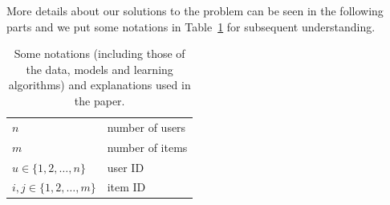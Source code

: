\documentclass[sigconf]{acmart}
\begin{document}
More details about our solutions to the problem can be seen in the following parts and we put some notations in Table~\ref{tbl:notation} for subsequent understanding.
\begin{table}[!htb]
	\caption{Some notations (including those of the data, models and learning algorithms) and explanations used in the paper.} \label{tbl:notation}
	\begin{center}
		
		\begin{tabular}{ l|l} \hline\hline
			
			$n$ & number of users\\
			
			$m$ & number of items\\
			
			$u \in \{1,2,\ldots,n\}$ & user ID\\
			
			$i,j \in \{1,2,\ldots,m\}$ & item ID\\
			
			
			

\end{tabular}
\end{center}
\end{table}
\end{document}
